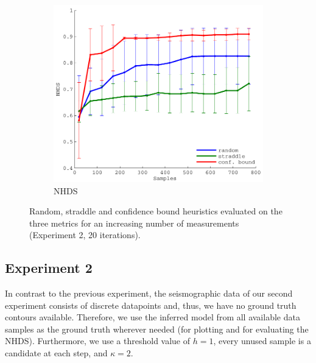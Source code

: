 \documentclass[11pt]{article} %
\begin{document}
\begin{figure}[h!]
  \hfill
  \begin{subfigure}[b]{0.329\textwidth}
    \centering
    \includegraphics[width=\textwidth]{figures/quake_hd}
    \caption{NHDS}
  \end{subfigure}
  \caption{Random, straddle and confidence bound heuristics evaluated on the three
           metrics for an increasing number of measurements
           (Experiment 2, 20 iterations).}
  \label{fig:quake_eval}
\end{figure}

\subsection{Experiment 2}
In contrast to the previous experiment, the seismographic data of our second
experiment consists of discrete datapoints and, thus, we have no ground
truth contours available. Therefore, we use the inferred model from all
available data samples as the ground truth wherever needed (for plotting and
for evaluating the NHDS). Furthermore, we use a threshold value of $h = 1$, every
unused sample is a candidate at each step, and $\kappa = 2$.
\end{document}
